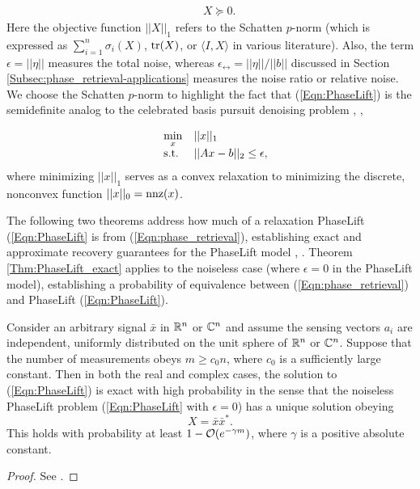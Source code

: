 \begin{enumerate}
\begin{equation}
\begin{array}{lll}
	&
		&	X \succeq 0.

\end{array}
\end{equation}
Here the objective function $||X||_1$ refers to the Schatten $p$-norm (which is expressed as $\sum_{i=1}^n \sigma_i(X)$, $\mathrm{tr}(X)$, or $\langle I, X \rangle$ in various literature).  Also, the term $\epsilon = ||\eta||$ measures the total noise, whereas $\epsilon_\rel = ||\eta|| / ||b||$ discussed in Section \ref{Subsec:phase_retrieval-applications} measures the noise ratio or relative noise.  We choose the Schatten $p$-norm to highlight the fact that (\ref{Eqn:PhaseLift}) is the semidefinite analog to the celebrated  basis pursuit denoising problem \cite{chen2001atomic}, \cite{candes2006stable},

\begin{equation}  			\label{Eqn:basis_pursuit}
\begin{array}{lll}
	&	\min\limits_{\substack{x}}
		&	||x||_1
			\\
	&	\textnormal{s.t.}
		&	||Ax-b||_2 \leq \epsilon,
\end{array}
\end{equation}
where minimizing $||x||_1$ serves as a convex relaxation to minimizing the discrete, nonconvex function $||x||_0 = \textnormal{nnz}(x)$.



The following two theorems address how much of a relaxation PhaseLift (\ref{Eqn:PhaseLift} is from (\ref{Eqn:phase_retrieval}), establishing exact and approximate recovery guarantees for the PhaseLift model \cite{candes2014solving}, \cite{candes2013phaselift}.  Theorem \ref{Thm:PhaseLift_exact} applies to the noiseless case (where $\epsilon = 0$ in the PhaseLift model), establishing a probability of equivalence between (\ref{Eqn:phase_retrieval}) and PhaseLift (\ref{Eqn:PhaseLift}).  


\begin{theorem}  \label{Thm:PhaseLift_exact}
Consider an arbitrary signal $\bar{x}$ in ${\mathbb R}^n$ or ${\mathbb C}^n$ and assume the sensing vectors $a_i$ are independent, uniformly distributed on the unit sphere of ${\mathbb R}^n$ or ${\mathbb C}^n$.  Suppose that the number of measurements obeys $m \geq c_0 n$, where $c_0$ is a sufficiently large constant. Then in both the real and complex cases, the solution to (\ref{Eqn:PhaseLift}) is exact with high probability in the sense that the noiseless PhaseLift problem (\ref{Eqn:PhaseLift} with $\epsilon = 0$) has a unique solution obeying
\[
X = \bar{x}\bar{x}^*.
\]
This holds with probability at least $1 - {\mathcal O}(e^{-\gamma m})$, where $\gamma$ is a positive absolute constant.
\end{theorem}
\begin{proof}
See \cite[Section 2]{candes2014solving}.
\end{proof}





\end{enumerate}

